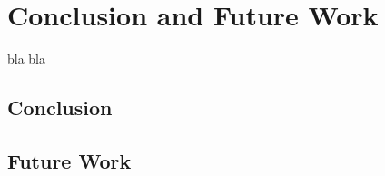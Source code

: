 \chapter{Conclusion and Future Work}
\label{cha:conclusion}
\glsresetall

bla bla

\section{Conclusion}
\label{sec:conclusion}


\section{Future Work}
\label{sec:future_work}